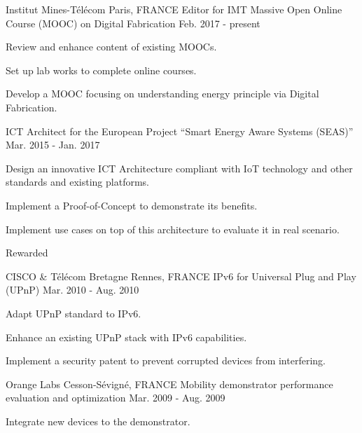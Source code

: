 \begin{cventries}
  \cventry
    {Institut Mines-T\'{e}l\'{e}com}
    {Paris, FRANCE}
    {Editor for IMT Massive Open Online Course (MOOC) on Digital Fabrication }
    {Feb. 2017 - present}
    {
      \begin{cvitems}
        \item {Review and enhance content of existing MOOCs.}
        \item {Set up lab works to complete online courses.}
        \item {Develop a MOOC focusing on understanding energy principle via Digital Fabrication.}
      \end{cvitems}
    }
  \cventry
    { }
    { }
    {\hspace*{0,7cm} ICT Architect for the European Project ``Smart Energy Aware Systems (SEAS)''}
    {Mar. 2015 - Jan. 2017}
    {
      \begin{cvitems}
        \item {Design an innovative ICT Architecture compliant with IoT technology and other standards and existing platforms.}
        \item {Implement a Proof-of-Concept to demonstrate its benefits.}
        \item {Implement use cases on top of this architecture to evaluate it in real scenario.}
      \end{cvitems}
      \begin{cvspecificitems}
      	\item Rewarded 
      \end{cvspecificitems}
    }
  \cventry
    {CISCO \& T\'{e}l\'{e}com Bretagne}
    {Rennes, FRANCE}
    {IPv6 for Universal Plug and Play (UPnP)}
    {Mar. 2010 - Aug. 2010}
    {
      \begin{cvitems}
        \item {Adapt UPnP standard to IPv6.}
        \item {Enhance an existing UPnP stack with IPv6 capabilities.}
        \item {Implement a security patent to prevent corrupted devices from interfering.}
      \end{cvitems}
    }
  \cventry
    {Orange Labs}
    {Cesson-S\'{e}vign\'{e}, FRANCE}
    {Mobility demonstrator performance evaluation and optimization}
    {Mar. 2009 - Aug. 2009}
    {
      \begin{cvitems}
        \item {Integrate new devices to the demonstrator.}

\end{cvitems}}
\end{cventries}
